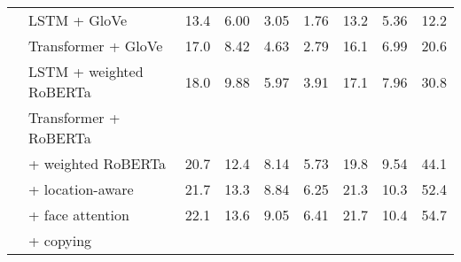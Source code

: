\begin{table*}[p]
\begin{tabularx}{\textwidth}{llXXXXXXX}
      & LSTM + GloVe & 13.4 & 6.00 & 3.05 & 1.76 & 13.2 & 5.36 & 12.2 \\ %
      & Transformer + GloVe & 17.0 & 8.42 & 4.63 & 2.79 & 16.1 & 6.99 & 20.6 \\ %
      & LSTM + weighted RoBERTa & 18.0 & 9.88 & 5.97 & 3.91 & 17.1 & 7.96 & 30.8 \\ %
      \cmidrule{2-9}
      & Transformer + RoBERTa \\
      & \quad + weighted RoBERTa & 20.7 & 12.4 & 8.14 & 5.73 & 19.8 & 9.54 & 44.1 \\ %
      & \quad\quad + location-aware & 21.7 & 13.3 & 8.84 & 6.25 & 21.3 & 10.3 & 52.4 \\ %
      & \quad\quad\quad + face attention & 22.1 & 13.6 & 9.05 & 6.41 & 21.7 & 10.4 & 54.7 \\ %
      & \quad\quad\quad\quad + copying \\
      \bottomrule
	\end{tabularx}
\end{table*}



